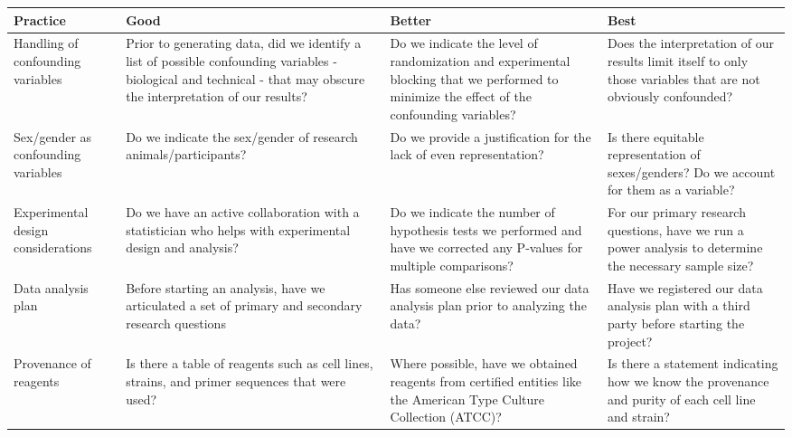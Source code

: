 \documentclass[]{article}
\begin{document}
\begin{center}
    \scriptsize{}
    \renewcommand{\arraystretch}{1.8}
  \begin{tabular}{ | P{3cm} | P{4cm} | P{4cm} | P{4cm} |}
  \hline
    \textbf{Practice} & \textbf{Good} & \textbf{Better} & \textbf{Best} \\ \hline
    Handling of confounding variables
    & Prior to generating data, did we identify a list of possible confounding variables - biological and technical - that may obscure the interpretation of our results?
    & Do we indicate the level of randomization and experimental blocking that we performed to minimize the effect of the confounding variables?
    & Does the interpretation of our results limit itself to only those variables that are not obviously confounded? \\ \hline

    Sex/gender as confounding variables
    & Do we indicate the sex/gender of research animals/participants?
    & Do we provide a justification for the lack of even representation?
    & Is there equitable representation of sexes/genders? Do we account for them as a variable? \\ \hline

    Experimental design considerations
    & Do we have an active collaboration with a statistician who helps with experimental design and analysis?
    & Do we indicate the number of hypothesis tests we performed and have we corrected any P-values for multiple comparisons?
    & For our primary research questions, have we run a power analysis to determine the necessary sample size? \\ \hline

    Data analysis plan
    & Before starting an analysis, have we articulated a set of primary and secondary research questions
    & Has someone else reviewed our data analysis plan prior to analyzing the data?
    & Have we registered our data analysis plan with a third party before starting the project? \\ \hline

    Provenance of reagents
    & Is there a table of reagents such as cell lines, strains, and primer sequences that were used?
    & Where possible, have we obtained reagents from certified entities like the American Type Culture Collection (ATCC)?
    & Is there a statement indicating how we know the provenance and purity of each cell line and strain? \\ \hline


\end{tabular}
\end{center}
\end{document}
